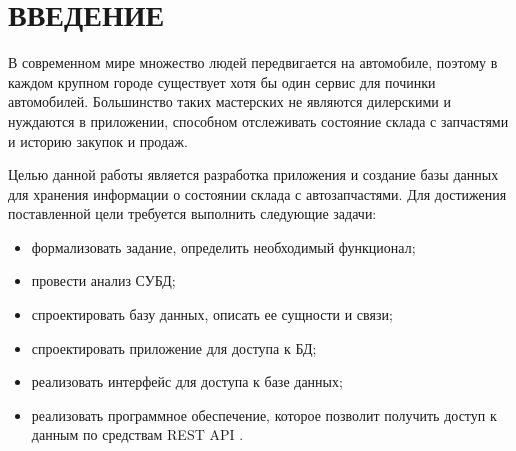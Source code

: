 \chapter*{ВВЕДЕНИЕ}

В современном мире множество людей передвигается на автомобиле, поэтому в каждом крупном городе существует хотя бы один сервис для починки автомобилей. Большинство таких мастерских не являются дилерскими и нуждаются в приложении, способном отслеживать состояние склада с запчастями и историю закупок и продаж.

Целью данной работы является разработка приложения и создание базы данных для хранения информации о состоянии склада с автозапчастями. Для достижения поставленной цели требуется выполнить следующие задачи:
\begin{itemize}
	\item формализовать задание, определить необходимый функционал;
	\item провести анализ СУБД; 
	\item спроектировать базу данных, описать ее сущности и связи;
	\item спроектировать приложение для доступа к БД;
	\item реализовать интерфейс для доступа к базе данных;
	\item реализовать программное обеспечение, которое позволит получить доступ к данным по средствам REST API \cite{rest-api}.
\end{itemize}